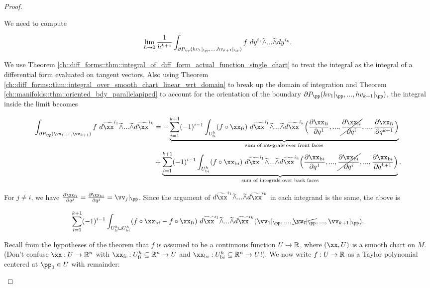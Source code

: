 \begin{proof}
\begin{enumerate}
        We need to compute
        
        \begin{align*}
            \lim_{h \rightarrow 0} \frac{1}{h^{k + 1}} \int_{\pd P_\pp(h v_1|_\pp, ..., hv_{k + 1}|_\pp)} f \spc dy^{i_1} \twedge ... \twedge dy^{i_k}.
        \end{align*}
        
        We use Theorem \ref{ch::diff_forms::thm::integral_of_diff_form_actual_function_single_chart} to treat the integral as the integral of a differential form evaluated on tangent vectors. Also using Theorem \ref{ch::diff_forms::thm::integral_over_smooth_chart_linear_wrt_domain} to break up the domain of integration and Theorem \ref{ch::manifolds::thm::oriented_bdy_parallelapiped} to account for the orientation of the boundary $\pd P_\pp(h v_1|_\pp, ..., hv_{k + 1}|_\pp)$, the integral inside the limit becomes
        
        \begin{align*}
            \int_{\pd P_\pp(\vv_1, ..., \vv_{k + 1})} f \spc d\tx^{i_1} \twedge ... \twedge d\tx^{i_k}
            &= -\underbrace{\sum_{i = 1}^{k + 1} (-1)^{i - 1} \int_{\Ufi} (f \circ \xfi) \spc d\tx^{i_1} \twedge ... \twedge d\tx^{i_k}\Big( \frac{\pd \xfi}{\pd q^1}, ..., \cancel{\frac{\pd \xfi}{\pd q^i}},..., \frac{\pd \xfi}{\pd q^{k + 1}} \Big)}_{\text{sum of integrals over front faces}} \\
            &+ \underbrace{\sum_{i = 1}^{k + 1} (-1)^{i - 1} \int_{\Ubi} (f \circ \xbi) \spc d\tx^{i_1} \twedge ... \twedge d\tx^{i_k}\Big( \frac{\pd \xbi}{\pd q^1}, ..., \cancel{\frac{\pd \xbi}{\pd q^i}} ,..., \frac{\pd \xbi}{\pd q^{k + 1}} \Big)}_{\text{sum of integrals over back faces}}.
        \end{align*}
        
        For $j \neq i$, we have $\frac{\pd \xfi}{\pd q^j} = \frac{\pd \xbi}{\pd q^j} = \vv_j|_\pp$. Since the argument of $d\tx^{i_1} \twedge ... \twedge d\tx^{i_k}$ in each integrand is the same, the above is
        
        \begin{align*}
            \sum_{i = 1}^{k + 1} (-1)^{i - 1} \int_{\Ufi \sqcup \Ubi} (f \circ \xbi - f \circ \xfi) \spc d\tx^{i_1} \twedge ... \twedge d\tx^{i_k}(\vv_1|_\pp, ..., \cancel{\vv_i|_\pp}, ..., \vv_{k + 1}|_\pp).
        \end{align*}
       
        Recall from the hypotheses of the theorem that $f$ is assumed to be a continuous function $U \rightarrow \mathbb{R}$, where $(\xx, U)$ is a smooth chart on $M$. (Don't confuse $\xx:U \rightarrow \R^n$ with $\xfi:\Ufi \subseteq \R^n \rightarrow U$ and $\xbi:\Ubi \subseteq \R^n \rightarrow U$!). We now write $f:U \rightarrow \mathbb{R}$ as a Taylor polynomial centered at $\pp_0 \in U$ with remainder:
        

\end{enumerate}
\end{proof}
